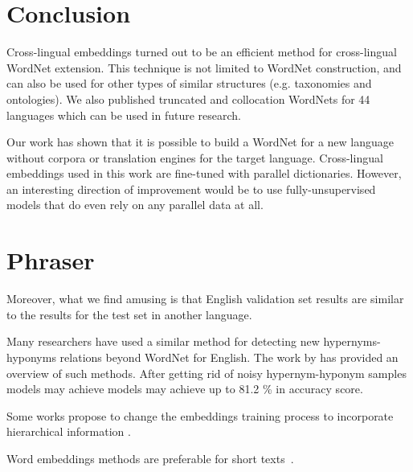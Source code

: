 \documentclass[11pt,a4paper]{article}
\begin{document}
\section{Conclusion}
Cross-lingual embeddings turned out to be an efficient method for cross-lingual WordNet extension. This technique is not limited to WordNet construction, and can also be used for other types of similar structures (e.g. taxonomies and ontologies). We also published truncated and collocation WordNets for 44 languages which can be used in future research.

Our work has shown that it is possible to build a WordNet for a new language without corpora or translation engines for the target language. Cross-lingual embeddings used in this work are fine-tuned with parallel dictionaries. However, an interesting direction of improvement would be to use fully-unsupervised models that do even rely on any parallel data at all.
\section{Phraser}
Moreover, what we find amusing is that English validation set results are similar to the results for the test set in another language.

Many researchers have used a similar method for detecting new hypernyms-hyponyms relations beyond WordNet for English. The work by \cite{sanchez2017well} has provided an overview of such methods. After getting rid of noisy hypernym-hyponym samples models may achieve models may achieve up to 81.2 \% in  accuracy score.

Some works propose to change the embeddings training process to incorporate hierarchical information \cite{alsuhaibani}.

Word embeddings methods are preferable for short texts~\cite{maslova-potapov}.



\end{document}
